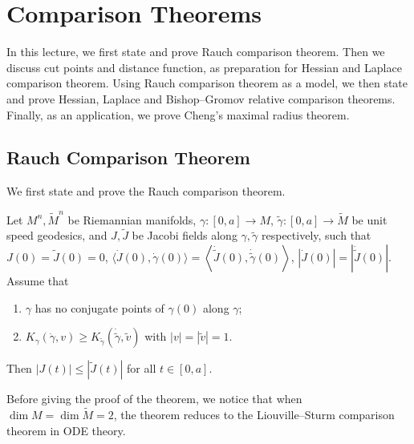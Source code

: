 \chapter{Comparison Theorems}
In this lecture, we first state and prove Rauch comparison theorem.
Then we discuss cut points and distance function, as preparation for Hessian and Laplace comparison theorem.
Using Rauch comparison theorem as a model, we then state and prove Hessian, Laplace and Bishop--Gromov relative comparison theorems.
Finally, as an application, we prove Cheng's maximal radius theorem.

\section{Rauch Comparison Theorem}

We first state and prove the Rauch comparison theorem.

\begin{thm}\label{Rauch}
    Let $M^n,\tilde{M}^n$ be Riemannian manifolds, $\gamma:[0,a]\to M$, $\tilde{\gamma}:[0,a]\to\tilde{M}$ be unit speed geodesics, and $J,\tilde{J}$ be Jacobi fields along $\gamma,\tilde{\gamma}$ respectively, such that $J(0)=\tilde{J}(0)=0$, $\langle\dot{J}(0),\dot{\gamma}(0)\rangle=\left\langle\dot{\tilde{J}}(0),\dot{\tilde{\gamma}}(0)\right\rangle$, $|\dot{J}(0)|=\left|\dot{\tilde{J}}(0)\right|$.
    Assume that
    \begin{enumerate}[(1)]
        \item $\gamma$ has no conjugate points of $\gamma(0)$ along $\gamma$;
        \item $K_\gamma(\dot{\gamma},v)\geq K_{\tilde{\gamma}}\left(\dot{\tilde{\gamma}},\tilde{v}\right)$ with $|v|=|\tilde{v}|=1$.
    \end{enumerate}
    Then $|J(t)|\leq|\tilde{J}(t)|$ for all $t\in[0,a]$.
\end{thm}

\begin{rem}
    Before giving the proof of the theorem, we notice that when $\dim M=\dim\tilde{M}=2$, the theorem reduces to the Liouville--Sturm comparison theorem in ODE theory.
\end{rem}

